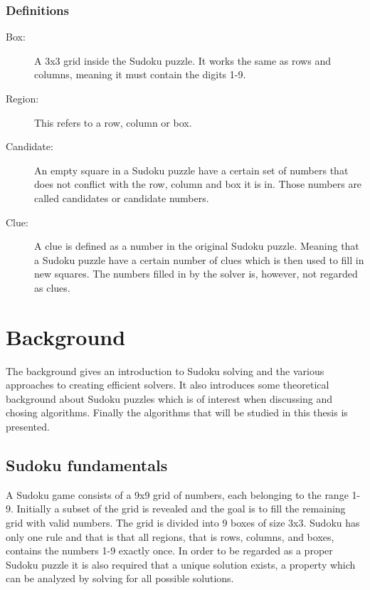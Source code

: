 \documentclass[a4paper,11pt]{kth-mag}
\begin{document}
\subsection{Definitions}
\begin{description}
    \item[Box:] A 3x3 grid inside the Sudoku puzzle. It works the same as rows and columns, meaning it must contain the digits 1-9.
    \item[Region:] This refers to a row, column or box.
    \item[Candidate:] An empty square in a Sudoku puzzle have a certain set of numbers that does not conflict with the row, column and box it is in. Those numbers are called candidates or candidate numbers.
    \item[Clue:] A clue is defined as a number in the original Sudoku puzzle. Meaning that a Sudoku puzzle have a certain number of clues which is then used to fill in new squares. The numbers filled in by the solver is, however, not regarded as clues.
\end{description}

\chapter{Background}
\label{sec:background}
The background gives an introduction to Sudoku solving and the various approaches to creating efficient solvers. It also introduces some theoretical background about Sudoku puzzles which is of interest when discussing and chosing algorithms. Finally the algorithms that will be studied in this thesis is presented.

\FloatBarrier
\section{Sudoku fundamentals}
A Sudoku game consists of a 9x9 grid of numbers, each belonging to the range 1-9.
Initially a subset of the grid is revealed and the goal is to fill the remaining grid with valid numbers.
The grid is divided into 9 boxes of size 3x3.
Sudoku has only one rule and that is that all regions, that is rows, columns, and boxes, contains the numbers 1-9 exactly once.\cite{17clueProof}
In order to be regarded as a proper Sudoku puzzle it is also required that a unique solution exists, a property which can be analyzed by solving for all possible solutions.
\end{document}
